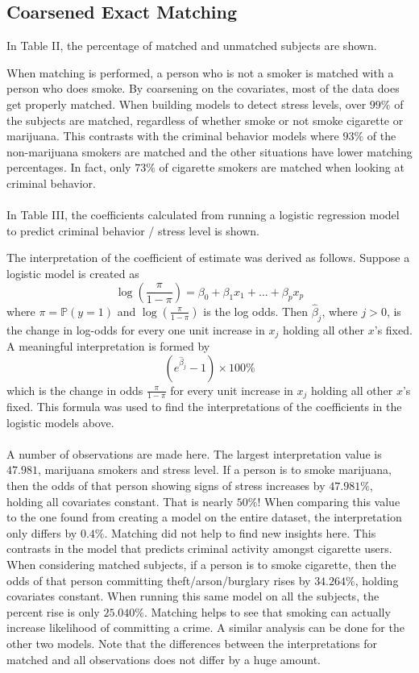 \documentclass[a4paper, 10pt, conference]{ieeeconf}
\begin{document}
\subsection{Coarsened Exact Matching}
In Table II, the percentage of matched and unmatched subjects are shown. 

When matching is performed, a person who is not a smoker is matched with a person who does smoke. By coarsening on the covariates, most of the data does get properly matched. When building models to detect stress levels, over $99\%$ of the subjects are matched, regardless of whether smoke or not smoke cigarette or marijuana. This contrasts with the criminal behavior models where $93\%$ of the non-marijuana smokers are matched and the other situations have lower matching percentages. In fact, only $73\%$ of cigarette smokers are matched when looking at criminal behavior. \\~\\
In Table III, the coefficients calculated from running a logistic regression model to predict criminal behavior / stress level is shown. 

The interpretation of the coefficient of estimate was derived as follows. Suppose a logistic model is created as $$ \log \left( \frac{\pi}{1-\pi} \right) = \beta_0 + \beta_1x_1 + \dots + \beta_px_p $$ where $\pi = \mathds{P}(y = 1)$ and $\log \left( \frac{\pi}{1-\pi} \right)$ is the log odds. Then $\hat{\beta}_j$, where $j > 0$, is the change in log-odds for every one unit increase in $x_j$ holding all other $x$'s fixed. A meaningful interpretation is formed by $$ (e^{\hat{\beta}_j} - 1) \times 100\%$$ which is the change in odds $\frac{\pi}{1-\pi}$ for every unit increase in $x_j$ holding all other $x$'s fixed. This formula was used to find the interpretations of the coefficients in the logistic models above. \\~\\
A number of observations are made here. The largest interpretation value is $47.981$, marijuana smokers and stress level. If a person is to smoke marijuana, then the odds of that person showing signs of stress increases by $47.981\%$, holding all covariates constant. That is nearly $50\%$! When comparing this value to the one found from creating a model on the entire dataset, the interpretation only differs by $0.4\%$. Matching did not help to find new insights here. This contrasts in the model that predicts criminal activity amongst cigarette users. When considering matched subjects, if a person is to smoke cigarette, then the odds of that person committing theft/arson/burglary rises by $34.264\%$, holding covariates constant. When running this same model on all the subjects, the percent rise is only $25.040\%$. Matching helps to see that smoking can actually increase likelihood of committing a crime. A similar analysis can be done for the other two models. Note that the differences between the interpretations for matched and all observations does not differ by a huge amount.
\end{document}
